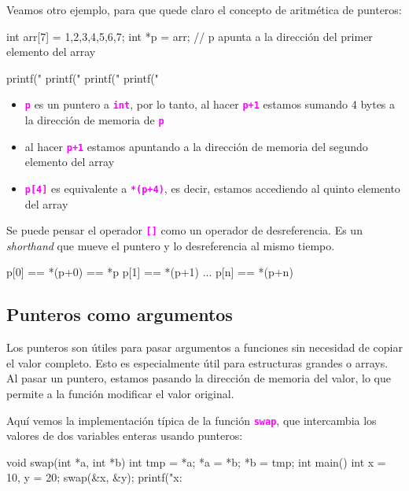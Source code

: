 \documentclass[]{scrartcl}
\newcommand{\hl}[1]{\textcolor{magenta}{\textbf{\texttt{#1}}}}
\begin{document}
Veamos otro ejemplo, para que quede claro el concepto de aritmética de punteros:

\begin{cbox}[]{}
  int arr[7] = {1,2,3,4,5,6,7};
  int *p = arr; 
  // p apunta a la dirección del primer elemento del array

  printf("%
  printf("%
  printf("%
  printf("%
\end{cbox}

\begin{itemize}
  \item \hl{p} es un puntero a \hl{int}, por lo tanto, al hacer \hl{p+1} estamos sumando 4 bytes a la dirección de memoria de \hl{p}
  \item al hacer \hl{p+1} estamos apuntando a la dirección de memoria del segundo elemento del array
  \item \hl{p[4]} es equivalente a \hl{*(p+4)}, es decir, estamos accediendo al quinto elemento del array
\end{itemize}

Se puede pensar el operador \hl{[]} como un operador de desreferencia. Es un \textit{shorthand} que mueve el puntero y lo desreferencia al mismo tiempo.

\begin{cbox}[]{}
p[0] == *(p+0) == *p
p[1] == *(p+1)
...
p[n] == *(p+n)
\end{cbox}

\subsection*{Punteros como argumentos}

Los punteros son útiles para pasar argumentos a funciones sin necesidad de copiar el valor completo. Esto es especialmente útil para estructuras grandes o arrays. Al pasar un puntero, estamos pasando la dirección de memoria del valor, lo que permite a la función modificar el valor original.

Aquí vemos la implementación típica de la función \hl{swap}, que intercambia los valores de dos variables enteras usando punteros:

\begin{cbox}[]{}

    void swap(int *a, int *b) {
        int tmp = *a;
        *a = *b;
        *b = tmp;
    }
    int main() {
        int x = 10, y = 20;
        swap(&x, &y);
        printf("x: %
    }
\end{cbox}
\end{document}
